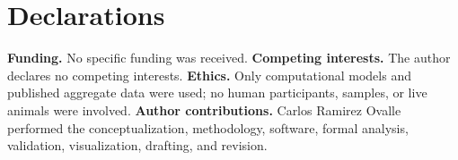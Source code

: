 \documentclass{ws-jbcb}
\numberwithin{equation}{section}
\begin{document}
\section*{Declarations}

\noindent\textbf{Funding.} No specific funding was received.
\textbf{Competing interests.} The author declares no competing interests.
\textbf{Ethics.} Only computational models and published aggregate data were
used; no human participants, samples, or live animals were involved.
\textbf{Author contributions.} Carlos Ramirez Ovalle performed the
conceptualization, methodology, software, formal analysis, validation,
visualization, drafting, and revision.


\end{document}
